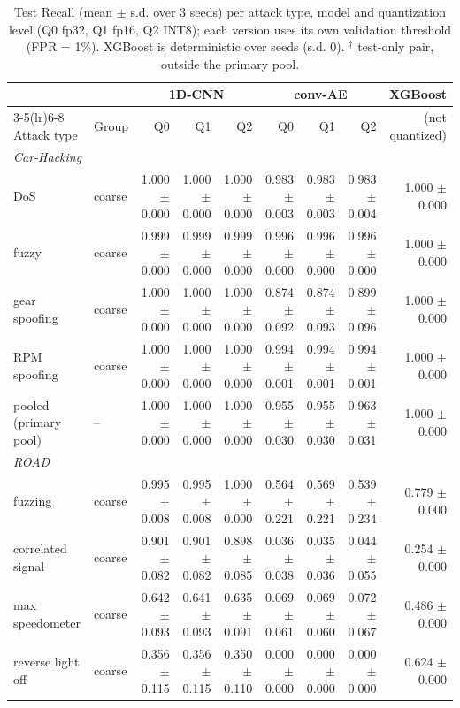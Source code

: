 \begin{table}[t]
\centering
\footnotesize
\caption{Test Recall (mean $\pm$ s.d. over 3 seeds) per attack type, model and quantization level (Q0 fp32, Q1 fp16, Q2 INT8); each version uses its own validation threshold (FPR = 1\%). XGBoost is deterministic over seeds (s.d. 0). $^\dagger$ test-only pair, outside the primary pool.}
\label{tab:recall}
\begin{tabular}{@{}llrrrrrrr@{}}
\toprule
& & \multicolumn{3}{c}{1D-CNN} & \multicolumn{3}{c}{conv-AE} & XGBoost \\
\cmidrule(lr){3-5}\cmidrule(lr){6-8}
Attack type & Group & Q0 & Q1 & Q2 & Q0 & Q1 & Q2 & (not quantized) \\
\midrule
\multicolumn{9}{l}{\textit{Car-Hacking}} \\
DoS & coarse & 1.000 $\pm$ 0.000 & 1.000 $\pm$ 0.000 & 1.000 $\pm$ 0.000 & 0.983 $\pm$ 0.003 & 0.983 $\pm$ 0.003 & 0.983 $\pm$ 0.004 & 1.000 $\pm$ 0.000 \\
fuzzy & coarse & 0.999 $\pm$ 0.000 & 0.999 $\pm$ 0.000 & 0.999 $\pm$ 0.000 & 0.996 $\pm$ 0.000 & 0.996 $\pm$ 0.000 & 0.996 $\pm$ 0.000 & 1.000 $\pm$ 0.000 \\
gear spoofing & coarse & 1.000 $\pm$ 0.000 & 1.000 $\pm$ 0.000 & 1.000 $\pm$ 0.000 & 0.874 $\pm$ 0.092 & 0.874 $\pm$ 0.093 & 0.899 $\pm$ 0.096 & 1.000 $\pm$ 0.000 \\
RPM spoofing & coarse & 1.000 $\pm$ 0.000 & 1.000 $\pm$ 0.000 & 1.000 $\pm$ 0.000 & 0.994 $\pm$ 0.001 & 0.994 $\pm$ 0.001 & 0.994 $\pm$ 0.001 & 1.000 $\pm$ 0.000 \\
pooled (primary pool) & -- & 1.000 $\pm$ 0.000 & 1.000 $\pm$ 0.000 & 1.000 $\pm$ 0.000 & 0.955 $\pm$ 0.030 & 0.955 $\pm$ 0.030 & 0.963 $\pm$ 0.031 & 1.000 $\pm$ 0.000 \\
\midrule
\multicolumn{9}{l}{\textit{ROAD}} \\
fuzzing & coarse & 0.995 $\pm$ 0.008 & 0.995 $\pm$ 0.008 & 1.000 $\pm$ 0.000 & 0.564 $\pm$ 0.221 & 0.569 $\pm$ 0.221 & 0.539 $\pm$ 0.234 & 0.779 $\pm$ 0.000 \\
correlated signal & coarse & 0.901 $\pm$ 0.082 & 0.901 $\pm$ 0.082 & 0.898 $\pm$ 0.085 & 0.036 $\pm$ 0.038 & 0.035 $\pm$ 0.036 & 0.044 $\pm$ 0.055 & 0.254 $\pm$ 0.000 \\
max speedometer & coarse & 0.642 $\pm$ 0.093 & 0.641 $\pm$ 0.093 & 0.635 $\pm$ 0.091 & 0.069 $\pm$ 0.061 & 0.069 $\pm$ 0.060 & 0.072 $\pm$ 0.067 & 0.486 $\pm$ 0.000 \\
reverse light off & coarse & 0.356 $\pm$ 0.115 & 0.356 $\pm$ 0.115 & 0.350 $\pm$ 0.110 & 0.000 $\pm$ 0.000 & 0.000 $\pm$ 0.000 & 0.000 $\pm$ 0.000 & 0.624 $\pm$ 0.000 \\

\end{tabular}
\end{table}
